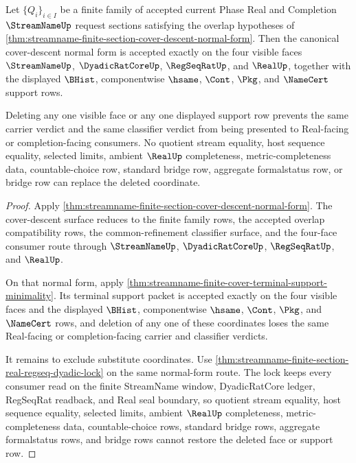 \begin{theorem}
\label{thm:streamname-finite-section-cover-descent-support-minimality}
Let $\{Q_i\}_{i \in I}$ be a finite family of accepted current Phase Real and
Completion $\StreamNameUp$ request sections satisfying the overlap hypotheses
of
\autoref{thm:streamname-finite-section-cover-descent-normal-form}. Then the
canonical cover-descent normal form is accepted exactly on the four visible
faces $\StreamNameUp$, $\DyadicRatCoreUp$, $\RegSeqRatUp$, and $\RealUp$,
together with the displayed $\BHist$, componentwise $\hsame$, $\Cont$,
$\Pkg$, and $\NameCert$ support rows.

Deleting any one visible face or any one displayed support row prevents the
same carrier verdict and the same classifier verdict from being presented to
Real-facing or completion-facing consumers. No quotient stream equality, host
sequence equality, selected limits, ambient $\RealUp$ completeness,
metric-completeness data, countable-choice row, standard bridge row, aggregate
formalstatus row, or bridge row can replace the deleted coordinate.
\end{theorem}
\begin{proof}
Apply
\autoref{thm:streamname-finite-section-cover-descent-normal-form}. The
cover-descent surface reduces to the finite family rows, the accepted overlap
compatibility rows, the common-refinement classifier surface, and the
four-face consumer route through $\StreamNameUp$, $\DyadicRatCoreUp$,
$\RegSeqRatUp$, and $\RealUp$.

On that normal form, apply
\autoref{thm:streamname-finite-cover-terminal-support-minimality}. Its
terminal support packet is accepted exactly on the four visible faces and the
displayed $\BHist$, componentwise $\hsame$, $\Cont$, $\Pkg$, and $\NameCert$
rows, and deletion of any one of these coordinates loses the same
Real-facing or completion-facing carrier and classifier verdicts.

It remains to exclude substitute coordinates. Use
\autoref{thm:streamname-finite-section-real-regseq-dyadic-lock} on the same
normal-form route. The lock keeps every consumer read on the finite StreamName
window, DyadicRatCore ledger, RegSeqRat readback, and Real seal boundary, so
quotient stream equality, host sequence equality, selected limits, ambient
$\RealUp$ completeness, metric-completeness data, countable-choice rows,
standard bridge rows, aggregate formalstatus rows, and bridge rows cannot
restore the deleted face or support row.
\end{proof}
